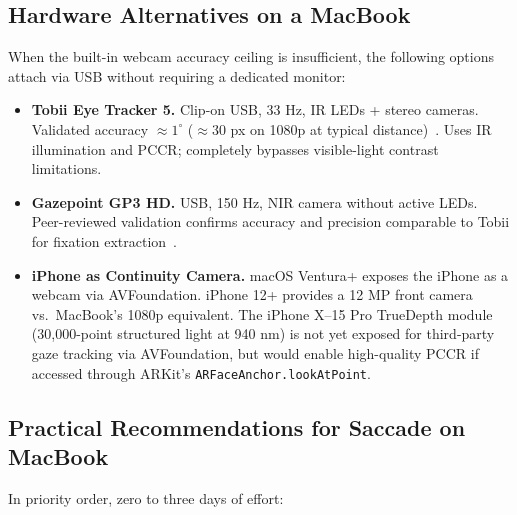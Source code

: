 \documentclass[11pt,a4paper]{article}
\begin{document}
\subsection{Hardware Alternatives on a MacBook}

When the built-in webcam accuracy ceiling is insufficient, the following options
attach via USB without requiring a dedicated monitor:

\begin{itemize}
  \item \textbf{Tobii Eye Tracker 5.} Clip-on USB, 33 Hz, IR LEDs + stereo cameras.
        Validated accuracy $\approx1^\circ$ ($\approx30$ px on 1080p at typical distance)~\cite{tobii5eval}.
        Uses IR illumination and PCCR; completely bypasses visible-light contrast limitations.
  \item \textbf{Gazepoint GP3 HD.} USB, 150 Hz, NIR camera without active LEDs.
        Peer-reviewed validation confirms accuracy and precision comparable to Tobii
        for fixation extraction~\cite{gazepoint2022}.
  \item \textbf{iPhone as Continuity Camera.} macOS Ventura+ exposes the iPhone as
        a webcam via AVFoundation.
        iPhone 12+ provides a 12 MP front camera vs.\ MacBook's 1080p equivalent.
        The iPhone X--15 Pro TrueDepth module (30,000-point structured light at 940 nm)
        is not yet exposed for third-party gaze tracking via AVFoundation, but would
        enable high-quality PCCR if accessed through ARKit's \texttt{ARFaceAnchor.lookAtPoint}.
\end{itemize}

\subsection{Practical Recommendations for Saccade on MacBook}

In priority order, zero to three days of effort:
\end{document}
